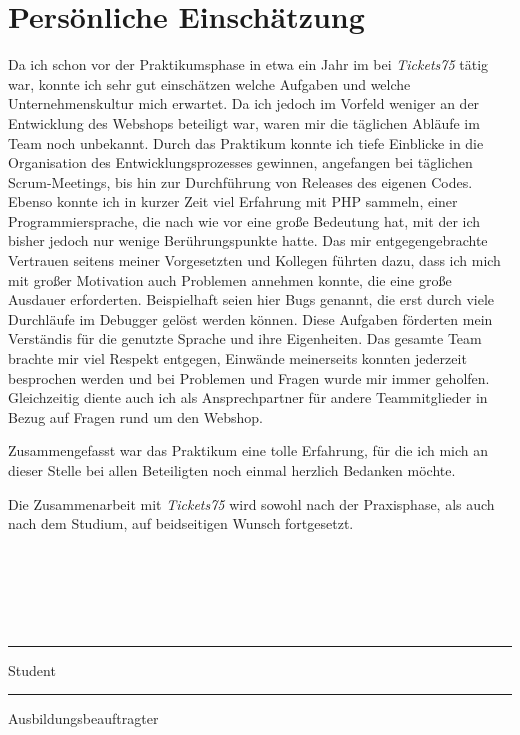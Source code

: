 \chapter{Persönliche Einschätzung}\label{ch:personal} 
Da ich schon vor der Praktikumsphase in etwa ein Jahr im bei \textit{Tickets75} tätig war, konnte ich sehr gut einschätzen welche Aufgaben und welche 
Unternehmenskultur mich erwartet. Da ich jedoch im Vorfeld weniger an der Entwicklung des Webshops beteiligt war, waren mir die täglichen Abläufe im Team noch unbekannt.
Durch das Praktikum konnte ich tiefe Einblicke in die Organisation des Entwicklungsprozesses gewinnen, angefangen bei täglichen Scrum-Meetings, bis hin zur Durchführung von Releases des 
eigenen Codes.
Ebenso konnte ich in kurzer Zeit viel Erfahrung mit PHP sammeln, einer Programmiersprache, die nach wie vor eine große Bedeutung hat, mit der ich bisher jedoch 
nur wenige Berührungspunkte hatte. 
Das mir entgegengebrachte Vertrauen seitens meiner Vorgesetzten und Kollegen führten dazu, dass ich mich mit großer Motivation auch Problemen annehmen konnte, die 
eine große Ausdauer erforderten. Beispielhaft seien hier Bugs genannt, die erst durch viele Durchläufe im Debugger gelöst werden können. 
Diese Aufgaben förderten mein Verständis für die genutzte Sprache und ihre Eigenheiten.
Das gesamte Team brachte mir viel Respekt entgegen, Einwände meinerseits konnten jederzeit besprochen werden und bei Problemen und Fragen wurde mir immer geholfen.
Gleichzeitig diente auch ich als Ansprechpartner für andere Teammitglieder in Bezug auf Fragen rund um den Webshop.

Zusammengefasst war das Praktikum eine tolle Erfahrung, für die ich mich an dieser Stelle bei allen Beteiligten noch einmal herzlich Bedanken möchte.

Die Zusammenarbeit mit \textit{Tickets75} wird sowohl nach der Praxisphase, als auch nach dem Studium, auf beidseitigen Wunsch fortgesetzt.
\\
\\
\\
\\
\\
\\


\parbox{4cm}{\centering \hrule
\strut \centering\footnotesize Student} \hfill\parbox{4cm}{\hrule
\strut \centering\footnotesize Ausbildungsbeauftragter}

